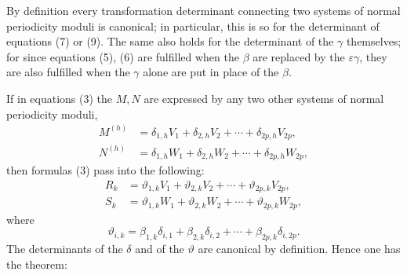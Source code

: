 \documentclass[10pt]{article}
\begin{document}
By definition every transformation determinant connecting two systems of normal periodicity moduli is canonical; in particular, this is so for the determinant of equations (7) or (9). The same also holds for the determinant of the \(\gamma\) themselves; for since equations (5), (6) are fulfilled when the \(\beta\) are replaced by the \(\varepsilon\gamma\), they are also fulfilled when the \(\gamma\) alone are put in place of the \(\beta\).

If in equations (3) the \(M,N\) are expressed by any two other systems of normal periodicity moduli,
\[
\begin{aligned}
M^{(h)}&=\delta_{1,h}V_1+\delta_{2,h}V_2+\cdots+\delta_{2p,h}V_{2p},\\
N^{(h)}&=\delta_{1,h}W_1+\delta_{2,h}W_2+\cdots+\delta_{2p,h}W_{2p},
\end{aligned}
\]
then formulas (3) pass into the following:
\[
\begin{aligned}
R_k&=\vartheta_{1,k}V_1+\vartheta_{2,k}V_2+\cdots+\vartheta_{2p,k}V_{2p},\\
S_k&=\vartheta_{1,k}W_1+\vartheta_{2,k}W_2+\cdots+\vartheta_{2p,k}W_{2p},
\end{aligned}
\]
where
\[
\vartheta_{i,k}=\beta_{1,k}\delta_{i,1}+\beta_{2,k}\delta_{i,2}+\cdots+\beta_{2p,k}\delta_{i,2p}.
\]
The determinants of the \(\delta\) and of the \(\vartheta\) are canonical by definition. Hence one has the theorem:
\end{document}

